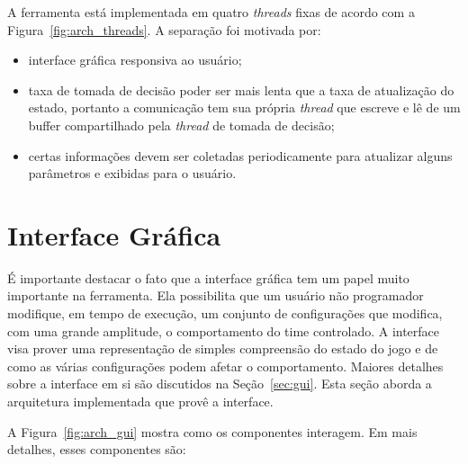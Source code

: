 A ferramenta está implementada em quatro \textit{threads} fixas de acordo com a
Figura~\ref{fig:arch_threads}.  A separação foi motivada por:

\begin{itemize}
  \item interface gráfica responsiva ao usuário;
  \item taxa de tomada de decisão poder ser mais lenta que a taxa de
    atualização do estado, portanto a comunicação tem sua própria
    \textit{thread} que escreve e lê de um buffer compartilhado pela
    \textit{thread} de tomada de decisão;
  \item certas informações devem ser coletadas periodicamente para atualizar
    alguns parâmetros e exibidas para o usuário.
\end{itemize}

\section{Interface Gráfica}

É importante destacar o fato que a interface gráfica tem um papel muito
importante na ferramenta.  Ela possibilita que um usuário não programador
modifique, em tempo de execução, um conjunto de configurações que modifica, com
uma grande amplitude, o comportamento do time controlado.  A interface visa
prover uma representação de simples compreensão do estado do jogo e de como as
várias configurações podem afetar o comportamento.  Maiores detalhes sobre a
interface em si são discutidos na Seção~\ref{sec:gui}.  Esta seção aborda
a arquitetura implementada que provê a interface.

A Figura~\ref{fig:arch_gui} mostra como os componentes interagem.  Em mais
detalhes, esses componentes são:

